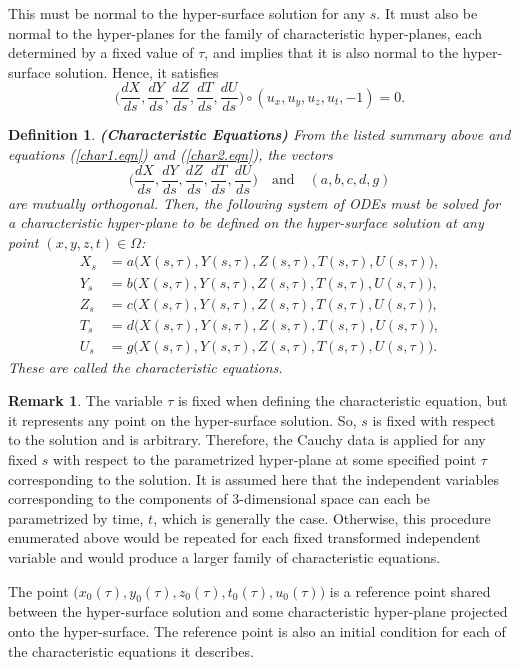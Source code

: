 \documentclass[12pt]{article}
\newtheorem{definition}{Definition}[section]
\theoremstyle{definition}
\newtheorem*{remark}{Remark}
\numberwithin{equation}{section}
\begin{document}
{\begin{enumerate}
This must be normal to the hyper-surface solution for any $s$. It must also be normal to the hyper-planes for the family of characteristic hyper-planes, each determined by a fixed value of $\tau$, and implies that it is also normal to the hyper-surface solution. Hence, it satisfies
\begin{equation}
\Big(\frac{dX}{ds},\frac{dY}{ds},\frac{dZ}{ds},\frac{dT}{ds},\frac{dU}{ds}\Big)\circ(u_x,u_y,u_z,u_t,-1)=0.
\label{char2.eqn}
\end{equation}
\end{enumerate}
\begin{definition}\textbf{(Characteristic Equations)}
From the listed summary above and equations (\ref{char1.eqn}) and (\ref{char2.eqn}), the vectors
$$\Big(\frac{dX}{ds},\frac{dY}{ds},\frac{dZ}{ds},\frac{dT}{ds},\frac{dU}{ds}\Big)\quad\mbox{and}\quad(a,b,c,d,g)$$
are mutually orthogonal. Then, the following system of ODEs must be solved for a characteristic hyper-plane to be defined on the hyper-surface solution at any point $(x,y,z,t)\in\Omega$:
\begin{align}\label{char3.eqn}
X_s&=a\big(X(s,\tau),Y(s,\tau),Z(s,\tau),T(s,\tau),U(s,\tau)\big),\\
Y_s&=b\big(X(s,\tau),Y(s,\tau),Z(s,\tau),T(s,\tau),U(s,\tau)\big),\\
Z_s&=c\big(X(s,\tau),Y(s,\tau),Z(s,\tau),T(s,\tau),U(s,\tau)\big),\\
T_s&=d\big(X(s,\tau),Y(s,\tau),Z(s,\tau),T(s,\tau),U(s,\tau)\big),\\
U_s&=g\big(X(s,\tau),Y(s,\tau),Z(s,\tau),T(s,\tau),U(s,\tau)\big).
\end{align}
These are called the characteristic equations. 
\end{definition}
\begin{remark}The variable $\tau$ is fixed when defining the characteristic equation, but it represents any point on the hyper-surface solution. So, $s$ is fixed with respect to the solution and is arbitrary. Therefore, the Cauchy data is applied for any fixed $s$ with respect to the parametrized hyper-plane at some specified point $\tau$ corresponding to the solution. It is assumed here that the independent variables corresponding to the components of 3-dimensional space can each be parametrized by time, $t$, which is generally the case. Otherwise, this procedure enumerated above would be repeated for each fixed transformed independent variable and would produce a larger family of characteristic equations.

The point $\big(x_0(\tau),y_0(\tau),z_0(\tau),t_0(\tau),u_0(\tau)\big)$ is a reference point shared between the hyper-surface solution and some characteristic hyper-plane projected onto the hyper-surface. The reference point is also an initial condition for each of the characteristic equations it describes.
\end{remark}

}
\end{document}
